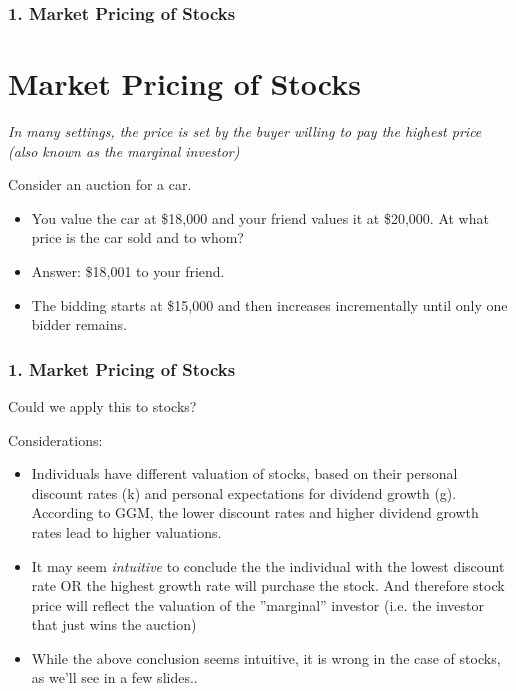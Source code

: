 \documentclass{beamer}
\begin{document}
\begin{frame}[t]
    \frametitle{1. Market Pricing of Stocks}
    \section{Market Pricing of Stocks}

   \textit{ In many settings, the price is set by the buyer willing to pay the highest price (also known as the marginal investor)}
   \vspace{1em}

    Consider an auction for a car. 
    \begin{itemize}
        \item You value the car at \$18,000 and your friend values it at \$20,000.   At what price is the car sold and to whom?
        \item Answer: \$18,001 to your friend.
        \item The bidding starts at \$15,000 and then increases incrementally until only one bidder remains.
    \end{itemize}

\end{frame}

\begin{frame}[t]
    \frametitle{1. Market Pricing of Stocks}

    Could we apply this to stocks?
    \vspace{1em}

    Considerations:
    \begin{itemize}
        \item Individuals have different valuation of stocks, based on their personal discount rates (k) and personal expectations for dividend growth (g).   According to GGM, the lower discount rates and higher dividend growth rates lead to higher valuations.
        \item It may seem \textit{intuitive} to conclude the the individual with the lowest discount rate OR the highest growth rate will purchase the stock.   And therefore stock price will reflect the valuation of the ”marginal” investor (i.e. the investor that just wins the auction)
        \item While the above conclusion seems intuitive, it is wrong in the case of stocks, as we'll see in a few slides..
    \end{itemize}
    
\end{frame}
\end{document}
